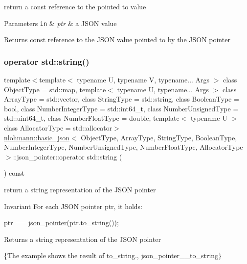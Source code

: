 return a const reference to the pointed to value 


\begin{DoxyParams}[1]{Parameters}
\mbox{\tt in}  & {\em ptr} & a J\+S\+ON value\\
\hline
\end{DoxyParams}
\begin{DoxyReturn}{Returns}
const reference to the J\+S\+ON value pointed to by the J\+S\+ON pointer 
\end{DoxyReturn}
\hypertarget{classnlohmann_1_1basic__json_1_1json__pointer_a319e945a9349ed49fe3a62bc023c8d23}{}\label{classnlohmann_1_1basic__json_1_1json__pointer_a319e945a9349ed49fe3a62bc023c8d23} 
\subsubsection{\texorpdfstring{operator std\+::string()}{operator std::string()}}
{\footnotesize\ttfamily template$<$template$<$ typename U, typename V, typename... Args $>$ class Object\+Type = std\+::map, template$<$ typename U, typename... Args $>$ class Array\+Type = std\+::vector, class String\+Type  = std\+::string, class Boolean\+Type  = bool, class Number\+Integer\+Type  = std\+::int64\+\_\+t, class Number\+Unsigned\+Type  = std\+::uint64\+\_\+t, class Number\+Float\+Type  = double, template$<$ typename U $>$ class Allocator\+Type = std\+::allocator$>$ \\
\hyperlink{classnlohmann_1_1basic__json}{nlohmann\+::basic\+\_\+json}$<$ Object\+Type, Array\+Type, String\+Type, Boolean\+Type, Number\+Integer\+Type, Number\+Unsigned\+Type, Number\+Float\+Type, Allocator\+Type $>$\+::json\+\_\+pointer\+::operator std\+::string (\begin{DoxyParamCaption}{ }\end{DoxyParamCaption}) const\hspace{0.3cm}{\ttfamily [inline]}}



return a string representation of the J\+S\+ON pointer 

\begin{DoxyInvariant}{Invariant}
For each J\+S\+ON pointer {\ttfamily ptr}, it holds\+: 
\begin{DoxyCode}
ptr == \hyperlink{classnlohmann_1_1basic__json_1_1json__pointer_ae12db117a2742d826465080979d7c835}{json\_pointer}(ptr.to\_string());
\end{DoxyCode}

\end{DoxyInvariant}
\begin{DoxyReturn}{Returns}
a string representation of the J\+S\+ON pointer
\end{DoxyReturn}
\{The example shows the result of {\ttfamily to\+\_\+string}., json\+\_\+pointer\+\_\+\+\_\+to\+\_\+string\}


